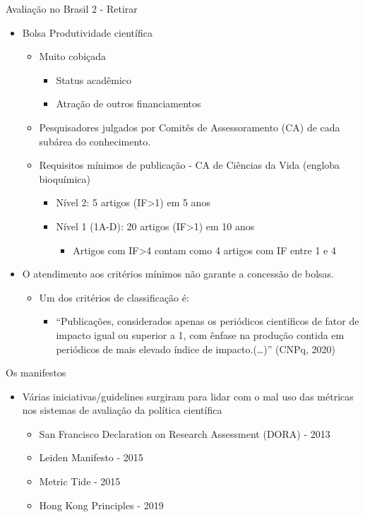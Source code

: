 \documentclass[bigger]{beamer}
\begin{document}
\begin{frame}[label={sec:org1345de1}]{Avaliação no Brasil 2 - Retirar}
\begin{itemize}
\item Bolsa Produtividade científica
\begin{itemize}
\item Muito cobiçada \parencite{mota2019}
\begin{itemize}
\item Status acadêmico
\item Atração de outros financiamentos
\end{itemize}

\item Pesquisadores julgados por Comitês de Assessoramento (CA) de cada subárea do conhecimento.

\item Requisitos mínimos de publicação - CA de Ciências da Vida (engloba bioquímica)
\begin{itemize}
\item Nível 2: 5 artigos (IF>1) em 5 anos
\item Nível 1 (1A-D): 20 artigos (IF>1) em 10 anos
\begin{itemize}
\item Artigos com \alert{IF>4 contam como 4 artigos com IF entre 1 e 4}
\end{itemize}
\end{itemize}
\end{itemize}

\item \alert{O  atendimento  aos  critérios  mínimos  não  garante  a  concessão  de  bolsas.}
\begin{itemize}
\item Um dos critérios de classificação é:
\begin{itemize}
\item ``Publicações, considerados apenas os periódicos científicos de fator de impacto igual ou superior a 1, com ênfase na produção contida em periódicos de mais elevado índice de impacto.(\ldots{})'' (CNPq, 2020)
\end{itemize}
\end{itemize}
\end{itemize}
\end{frame}

\begin{frame}[label={sec:orgdab6ecd}]{Os manifestos}
\begin{itemize}
\item Várias iniciativas/guidelines surgiram para lidar com o mal uso das métricas nos sistemas de avaliação da política científica
\begin{itemize}
\item San Francisco Declaration on Research Assessment (DORA) - 2013
\item Leiden Manifesto - 2015
\item Metric Tide - 2015
\item Hong Kong Principles - 2019
\end{itemize}
\end{itemize}
\end{frame}
\end{document}
